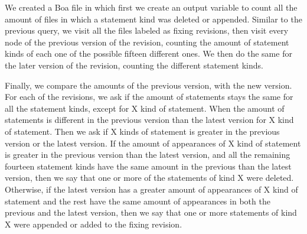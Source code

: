\documentclass{sig-alternate-05-2015}
\begin{document}
We created a Boa file in which first we create an output variable to count all the amount of files in which a statement kind was deleted or appended. Similar to the previous query, we visit all the files labeled as fixing revisions, then visit every node of the previous version of the revision, counting the amount of statement kinds of each one of the possible fifteen different ones. We then do the same for the later version of the revision, counting the different statement kinds.

Finally, we compare the amounts of the previous version, with the new version. For each of the revisions, we ask if the amount of statements stays the same for all the statement kinds, except for X kind of statement. When the amount of statements is different in the previous version than the latest version for X kind of statement. Then we ask if X kinds of statement is greater in the previous version or the latest version. If the amount of appearances of X kind of statement is greater in the previous version than the latest version, and all the remaining fourteen statement kinds have the same amount in the previous than the latest version, then we say that one or more of the statements of kind X were deleted. Otherwise, if the latest version has a greater amount of appearances of X kind of statement and the rest have the same amount of appearances in both the previous and the latest version, then we say that one or more statements of kind X were appended or added to the fixing revision.




\end{document}
